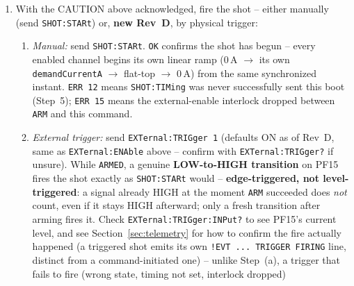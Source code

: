 \documentclass[11pt]{article}
\newcommand{\code}[1]{\texttt{#1}}
\begin{document}
\begin{enumerate}[label=\arabic*.]
    \textbf{\code{EXTernal:ENAble} default, Rev~D:} this interlock
    (PF13) now defaults \textbf{ON} at every boot (was opt-in/OFF
    through Rev~C). On hardware with a real external-enable signal
    wired to PF13, this Just Works. On a bare bench setup with nothing
    wired there, PF13's resting level depends on the specific hardware
    -- some fiber receivers idle HIGH with no signal present (interlock
    satisfied by default), a genuinely floating pin reads LOW via the
    board's own pull-down (interlock blocks \code{ARM} until either the
    real signal is wired, looped back via \code{DIAGnostic:GPOut11}
    (below), or \code{EXTernal:ENAble 0} is sent first for this
    session). Check \code{EXTernal:INPut?} to see PF13's actual current
    level before assuming which case applies.
  \item With the CAUTION above acknowledged, fire the shot -- either
    manually (send \code{SHOT:STARt}) or, \textbf{new Rev~D}, by
    physical trigger:
    \begin{enumerate}[label=(\alph*)]
      \item \emph{Manual:} send \code{SHOT:STARt}. \code{OK}
        confirms the shot has begun -- every enabled channel begins its
        own linear ramp (0\,A $\to$ its own \code{demandCurrentA} $\to$
        flat-top $\to$ 0\,A) from the same synchronized instant.
        \code{ERR 12} means \code{SHOT:TIMing} was never
        successfully sent this boot (Step~5); \code{ERR 15} means the
        external-enable interlock dropped between \code{ARM} and this
        command.
      \item \emph{External trigger:} send \code{EXTernal:TRIGger 1}
        (defaults ON as of Rev~D, same as \code{EXTernal:ENAble} above
        -- confirm with \code{EXTernal:TRIGger?} if unsure). While
        \code{ARMED}, a genuine \textbf{LOW-to-HIGH transition} on PF15
        fires the shot exactly as \code{SHOT:STARt} would --
        \textbf{edge-triggered, not level-triggered}: a signal already
        HIGH at the moment \code{ARM} succeeded does \emph{not} count,
        even if it stays HIGH afterward; only a fresh transition after
        arming fires it. Check \code{EXTernal:TRIGger:INPut?} to see
        PF15's current level, and see Section~\ref{sec:telemetry} for
        how to confirm the fire actually happened (a triggered shot
        emits its own \code{!EVT ... TRIGGER FIRING} line, distinct
        from a command-initiated one) -- unlike Step~(a), a trigger that
        fails to fire (wrong state, timing not set, interlock dropped)

\end{enumerate}
\end{enumerate}
\end{document}
